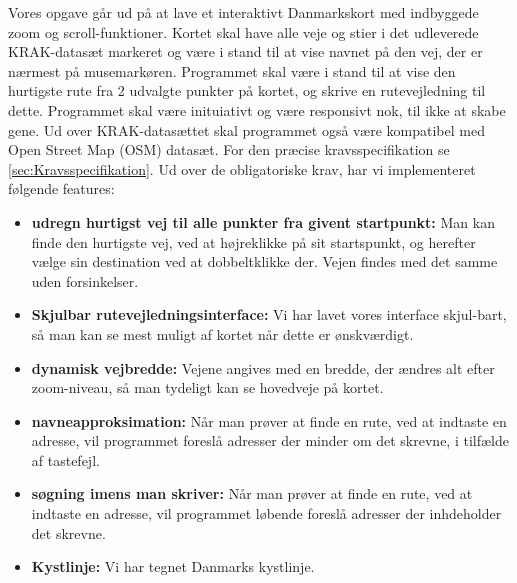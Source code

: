 Vores opgave går ud på at lave et interaktivt Danmarkskort med indbyggede zoom og scroll-funktioner. Kortet skal have alle veje og stier i det udleverede KRAK-datasæt markeret og være i stand til at vise navnet på den vej, der er nærmest på musemarkøren. Programmet skal være i stand til at vise den hurtigste rute fra 2 udvalgte punkter på kortet, og skrive en rutevejledning til dette. Programmet skal være inituiativt og være responsivt nok, til ikke at skabe gene. Ud over KRAK-datasættet skal programmet også være kompatibel med Open Street Map (OSM) datasæt. For den præcise kravsspecifikation se \ref{sec:Kravsspecifikation}.
\newline \newline
Ud over de obligatoriske krav, har vi implementeret følgende features:
\begin{itemize}
	\item \textbf{udregn hurtigst vej til alle punkter fra givent startpunkt:} Man kan finde den hurtigste vej, ved at højreklikke på sit startspunkt, og herefter vælge sin destination ved at dobbeltklikke der. Vejen findes med det samme uden forsinkelser.
	\item \textbf{Skjulbar rutevejledningsinterface:} Vi har lavet vores interface skjul-bart, så man kan se mest muligt af kortet når dette er ønskværdigt.
	\item \textbf{dynamisk vejbredde:} Vejene angives med en bredde, der ændres alt efter zoom-niveau, så man tydeligt kan se hovedveje på kortet.
	\item \textbf{navneapproksimation:} Når man prøver at finde en rute, ved at indtaste en adresse, vil programmet foreslå adresser der minder om det skrevne, i tilfælde af tastefejl.
	\item \textbf{søgning imens man skriver:} Når man prøver at finde en rute, ved at indtaste en adresse, vil programmet løbende foreslå adresser der inhdeholder det skrevne.
	\item \textbf{Kystlinje:} Vi har tegnet Danmarks kystlinje.
\end{itemize}